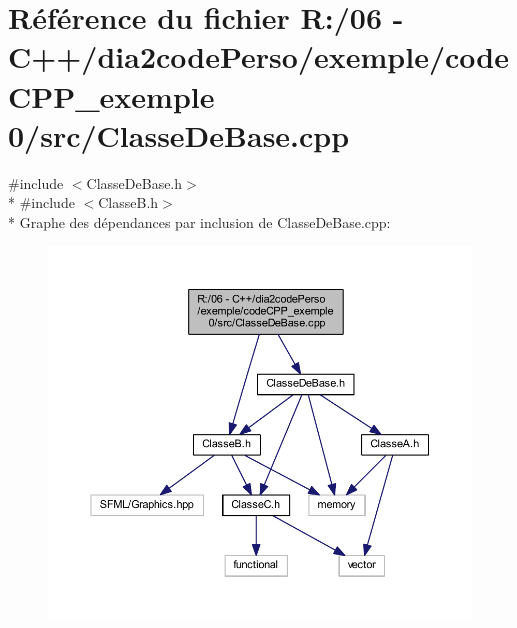 \section{Référence du fichier R\+:/06 -\/ C++/dia2code\+Perso/exemple/code\+C\+P\+P\+\_\+exemple 0/src/\+Classe\+De\+Base.cpp}
\label{_classe_de_base_8cpp}
{\ttfamily \#include $<$Classe\+De\+Base.\+h$>$}\\*
{\ttfamily \#include $<$Classe\+B.\+h$>$}\\*
Graphe des dépendances par inclusion de Classe\+De\+Base.\+cpp\+:
\nopagebreak
\begin{figure}[H]
\begin{center}
\leavevmode
\includegraphics[width=350pt]{_classe_de_base_8cpp__incl}
\end{center}
\end{figure}
